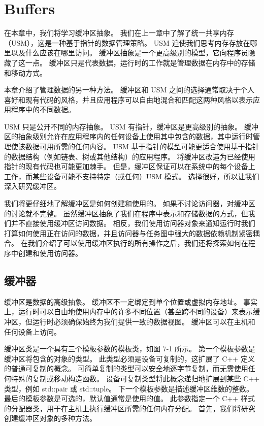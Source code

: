 \section{Buffers}
在本章中，我们将学习缓冲区抽象。 我们在上一章中了解了统一共享内存（USM），这是一种基于指针的数据管理策略。 USM 迫使我们思考内存存放在哪里以及什么应该在哪里访问。 缓冲区抽象是一个更高级别的模型，它向程序员隐藏了这一点。 缓冲区只是代表数据，运行时的工作就是管理数据在内存中的存储和移动方式。

本章介绍了管理数据的另一种方法。 缓冲区和 USM 之间的选择通常取决于个人喜好和现有代码的风格，并且应用程序可以自由地混合和匹配这两种风格以表示应用程序中的不同数据。

USM 只是公开不同的内存抽象。 USM 有指针，缓冲区是更高级别的抽象。 缓冲区的抽象级别允许在应用程序内的任何设备上使用其中包含的数据，其中运行时管理使该数据可用所需的任何内容。 USM 基于指针的模型可能更适合使用基于指针的数据结构（例如链表、树或其他结构）的应用程序。 将缓冲区改造为已经使用指针的现有代码也可能更加棘手。 但是，缓冲区保证可以在系统中的每个设备上工作，而某些设备可能不支持特定（或任何）USM 模式。 选择很好，所以让我们深入研究缓冲区。

我们将更仔细地了解缓冲区是如何创建和使用的。 如果不讨论访问器，对缓冲区的讨论就不完整。 虽然缓冲区抽象了我们在程序中表示和存储数据的方式，但我们并不直接使用缓冲区访问数据。 相反，我们使用访问器对象来通知运行时我们打算如何使用正在访问的数据，并且访问器与任务图中强大的数据依赖机制紧密耦合。 在我们介绍了可以使用缓冲区执行的所有操作之后，我们还将探索如何在程序中创建和使用访问器。


\subsection{缓冲器}
缓冲区是数据的高级抽象。 缓冲区不一定绑定到单个位置或虚拟内存地址。 事实上，运行时可以自由地使用内存中的许多不同位置（甚至跨不同的设备）来表示缓冲区，但运行时必须确保始终为我们提供一致的数据视图。 缓冲区可以在主机和任何设备上访问。

缓冲区类是一个具有三个模板参数的模板类，如图 7-1 所示。 第一个模板参数是缓冲区将包含的对象的类型。 此类型必须是设备可复制的，这扩展了 C++ 定义的普通可复制的概念。 可简单复制的类型可以安全地逐字节复制，而无需使用任何特殊的复制或移动构造函数。 设备可复制类型将此概念递归地扩展到某些 C++ 类型，例如 std::pair 或 std::tuple。 下一个模板参数是描述缓冲区维数的整数。 最后的模板参数是可选的，默认值通常是使用的值。 此参数指定一个 C++ 样式的分配器类，用于在主机上执行缓冲区所需的任何内存分配。 首先，我们将研究创建缓冲区对象的多种方法。

